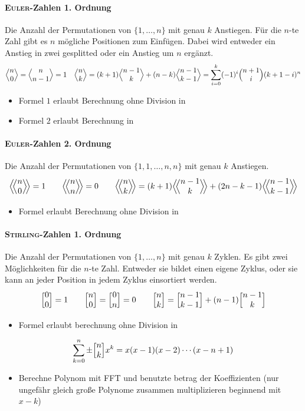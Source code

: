 \paragraph{\textsc{Euler}-Zahlen 1. Ordnung}
Die Anzahl der Permutationen von $\{1, \ldots, n\}$ mit genau $k$ Anstiegen.
Für die $n$-te Zahl gibt es $n$ mögliche Positionen zum Einfügen.
Dabei wird entweder ein Anstieg in zwei gesplitted oder ein Anstieg um $n$ ergänzt.
\[\Bigl\langle \begin{matrix} n \\ 0 \end{matrix} \Bigr\rangle = \Bigl\langle \begin{matrix} n \\ n-1 \end{matrix} \Bigr\rangle = 1 \quad
\Bigl\langle \begin{matrix} n \\ k \end{matrix} \Bigr\rangle = (k+1) \Bigl\langle \begin{matrix} n-1 \\ k \end{matrix} \Bigr\rangle + (n-k) \Bigl\langle \begin{matrix} n-1 \\ k-1 \end{matrix} \Bigr\rangle=
\sum_{i=0}^{k} (-1)^i\Bigl( \begin{matrix} n+1 \\ i \end{matrix} \Bigr)(k+1-i)^n\]
\begin{itemize}
	\item Formel $1$ erlaubt Berechnung ohne Division in 
	\item Formel $2$ erlaubt Berechnung in 
\end{itemize}

\paragraph{\textsc{Euler}-Zahlen 2. Ordnung}
Die Anzahl der Permutationen von $\{1,1, \ldots, n,n\}$ mit genau $k$ Anstiegen.
\[\eulerII{n}{0} = 1 \qquad\eulerII{n}{n} = 0 \qquad\eulerII{n}{k} = (k+1) \eulerII{n-1}{k} + (2n-k-1) \eulerII{n-1}{k-1}\]
\begin{itemize}
	\item Formel erlaubt Berechnung ohne Division in 
\end{itemize}

\paragraph{\textsc{Stirling}-Zahlen 1. Ordnung}
Die Anzahl der Permutationen von $\{1, \ldots, n\}$ mit genau $k$ Zyklen.
Es gibt zwei Möglichkeiten für die $n$-te Zahl. Entweder sie bildet einen eigene Zyklus, oder sie kann an jeder Position in jedem Zyklus einsortiert werden.
\[\Bigl[ \begin{matrix} 0 \\ 0 \end{matrix} \Bigr] = 1 \qquad
\Bigl[ \begin{matrix} n \\ 0 \end{matrix} \Bigr] = \Bigl[ \begin{matrix} 0 \\ n \end{matrix} \Bigr] = 0 \qquad
\Bigl[ \begin{matrix} n \\ k \end{matrix} \Bigr] = \Bigl[ \begin{matrix} n-1 \\ k-1 \end{matrix} \Bigr] + (n-1) \Bigl[ \begin{matrix} n-1 \\ k \end{matrix} \Bigr]\]
\begin{itemize}
	\item Formel erlaubt berechnung ohne Division in 
\end{itemize}
\[\sum_{k=0}^{n}\pm\Bigl[ \begin{matrix} n \\ k \end{matrix} \Bigr]x^k=x(x-1)(x-2)\cdots(x-n+1)\]
\begin{itemize}
	\item Berechne Polynom mit FFT und benutzte betrag der Koeffizienten  (nur ungefähr gleich große Polynome zusammen multiplizieren beginnend mit $x-k$)
\end{itemize}


